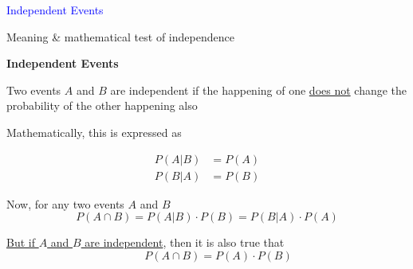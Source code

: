\documentclass[14pt,fleqn]{extarticle}
\begin{document}
\begin{skill}
\textcolor{blue}{Independent Events}

Meaning \& mathematical test of independence
\end{skill}

\newcard

\textbf{Independent Events}

Two events $A$ and $B$ are independent if the happening of one \underline{does not} change the probability of the other happening also\newline 

Mathematically, this is expressed as 

\begin{align}
	P \left(A\vert B \right) &= P(A) \\ 
	P \left(B\vert A \right) &= P(B)
\end{align}


Now, for any two events $A$ and $B$
\[P \left(A\cap B \right) = P \left(A\vert B \right)\cdot P(B) = P \left(B\vert A \right)\cdot P(A)\]

\underline{But if $A$ and $B$ are independent}, then it is also true that 
\[ \qquad P \left(A\cap B \right) = P(A) \cdot P(B)\]
\end{document}
